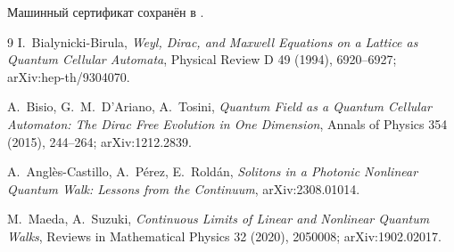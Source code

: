 Машинный сертификат сохранён в
.

\begin{thebibliography}{9}
I.~Bialynicki-Birula,
\emph{Weyl, Dirac, and Maxwell Equations on a Lattice as Quantum Cellular Automata},
Physical Review D 49 (1994), 6920--6927; arXiv:hep-th/9304070.

A.~Bisio, G.~M.~D'Ariano, A.~Tosini,
\emph{Quantum Field as a Quantum Cellular Automaton: The Dirac Free Evolution in One Dimension},
Annals of Physics 354 (2015), 244--264; arXiv:1212.2839.

A.~Angl\`es-Castillo, A.~P\'erez, E.~Rold\'an,
\emph{Solitons in a Photonic Nonlinear Quantum Walk: Lessons from the Continuum},
arXiv:2308.01014.

M.~Maeda, A.~Suzuki,
\emph{Continuous Limits of Linear and Nonlinear Quantum Walks},
Reviews in Mathematical Physics 32 (2020), 2050008;
arXiv:1902.02017.
\end{thebibliography}